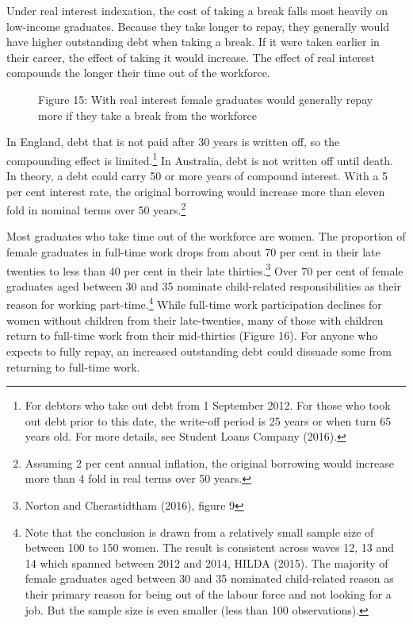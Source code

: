 \documentclass[embargoed]{grattan}
\begin{document}
Under real interest indexation, the cost of taking a break falls most heavily on low-income graduates. Because they take longer to repay, they generally would have higher outstanding debt when taking a break. If it were taken earlier in their career, the effect of taking it would increase. The effect of real interest compounds the longer their time out of the workforce.

\begin{figure}
\caption{Figure 15: With real interest female graduates would generally repay more if they take a break from the workforce}\label{fig:fig15-with-real-interest-female-grads-would-repay-more-if-they-took-break-from-workforce}


\end{figure}


In England, debt that is not paid after 30 years is written off, so the compounding effect is limited.\footnote{For debtors who take out debt from 1 September 2012. For those who took out debt prior to this date, the write-off period is 25 years or when turn 65 years old. For more details, see Student Loans Company (2016).} In Australia, debt is not written off until death. In theory, a debt could carry 50 or more years of compound interest. With a 5 per cent interest rate, the original borrowing would increase more than eleven fold in nominal terms over 50 years.\footnote{Assuming 2 per cent annual inflation, the original borrowing would increase more than 4 fold in real terms over 50 years.}

Most graduates who take time out of the workforce are women. The proportion of female graduates in full-time work drops from about 70 per cent in their late twenties to less than 40 per cent in their late thirties.\footnote{Norton and Cherastidtham (2016), figure 9} Over 70 per cent of female graduates aged between 30 and 35 nominate child-related responsibilities as their reason for working part-time.\footnote{Note that the conclusion is drawn from a relatively small sample size of between 100 to 150 women. The result is consistent across waves 12, 13 and 14 which spanned between 2012 and 2014, HILDA (2015). The majority of female graduates aged between 30 and 35 nominated child-related reason as their primary reason for being out of the labour force and not looking for a job. But the sample size is even smaller (less than 100 observations).} While full-time work participation declines for women without children from their late-twenties, many of those with children return to full-time work from their mid-thirties (Figure 16). For anyone who expects to fully repay, an increased outstanding debt could dissuade some from returning to full-time work.
\end{document}
